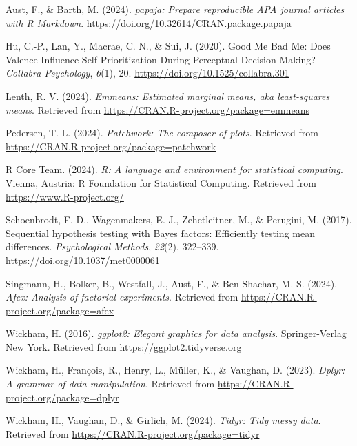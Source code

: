 \documentclass[
  man]{apa6}
\newlength{\cslhangindent}
\newenvironment{CSLReferences}[2] %
 {\begin{list}{}{%
  \setlength{\itemindent}{0pt}
  \setlength{\leftmargin}{0pt}
  \setlength{\parsep}{0pt}
  \ifodd #1
   \setlength{\leftmargin}{\cslhangindent}
   \setlength{\itemindent}{-1\cslhangindent}
  \fi
  \setlength{\itemsep}{#2\baselineskip}}}
 {\end{list}}
\begin{document}
\label{refs}
\begin{CSLReferences}{1}{0}
Aust, F., \& Barth, M. (2024). \emph{{papaja}: {Prepare} reproducible {APA} journal articles with {R Markdown}}. \url{https://doi.org/10.32614/CRAN.package.papaja}

Hu, C.-P., Lan, Y., Macrae, C. N., \& Sui, J. (2020). Good {Me} {Bad} {Me}: {Does} {Valence} {Influence} {Self}-{Prioritization} {During} {Perceptual} {Decision}-{Making}? \emph{Collabra-Psychology}, \emph{6}(1), 20. \url{https://doi.org/10.1525/collabra.301}

Lenth, R. V. (2024). \emph{Emmeans: Estimated marginal means, aka least-squares means}. Retrieved from \url{https://CRAN.R-project.org/package=emmeans}

Pedersen, T. L. (2024). \emph{Patchwork: The composer of plots}. Retrieved from \url{https://CRAN.R-project.org/package=patchwork}

R Core Team. (2024). \emph{R: A language and environment for statistical computing}. Vienna, Austria: R Foundation for Statistical Computing. Retrieved from \url{https://www.R-project.org/}

Schoenbrodt, F. D., Wagenmakers, E.-J., Zehetleitner, M., \& Perugini, M. (2017). Sequential hypothesis testing with {Bayes} factors: {Efficiently} testing mean differences. \emph{Psychological Methods}, \emph{22}(2), 322--339. \url{https://doi.org/10.1037/met0000061}

Singmann, H., Bolker, B., Westfall, J., Aust, F., \& Ben-Shachar, M. S. (2024). \emph{Afex: Analysis of factorial experiments}. Retrieved from \url{https://CRAN.R-project.org/package=afex}

Wickham, H. (2016). \emph{ggplot2: Elegant graphics for data analysis}. Springer-Verlag New York. Retrieved from \url{https://ggplot2.tidyverse.org}

Wickham, H., François, R., Henry, L., Müller, K., \& Vaughan, D. (2023). \emph{Dplyr: A grammar of data manipulation}. Retrieved from \url{https://CRAN.R-project.org/package=dplyr}

Wickham, H., Vaughan, D., \& Girlich, M. (2024). \emph{Tidyr: Tidy messy data}. Retrieved from \url{https://CRAN.R-project.org/package=tidyr}

\end{CSLReferences}
\end{document}
